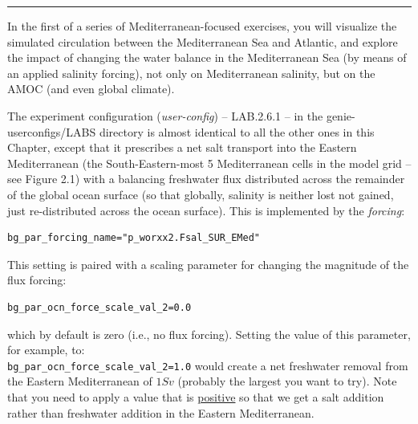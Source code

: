 \vspace{1mm}\noindent\rule{4cm}{0.5pt}\vspace{2mm}

\noindent  In the first of a series of Mediterranean-focused exercises, you will visualize the simulated circulation between the Mediterranean Sea and Atlantic, and explore the impact of changing the water balance in the Mediterranean Sea (by means of an applied salinity forcing), not only on Mediterranean salinity, but on the AMOC (and even global climate). 

\vspace{1mm}
The experiment configuration (\textit{user-config}) -- \textsf{\footnotesize LAB.2.6.1} -- in the \textsf{\footnotesize genie-userconfigs/LABS} directory is almost identical to all the other ones in this Chapter, except that it prescribes a net salt transport into the Eastern Mediterranean (the South-Eastern-most 5 Mediterranean cells in the model grid -- see Figure 2.1) with a balancing freshwater flux distributed across the remainder of the global ocean surface (so that globally, salinity is neither lost not gained, just re-distributed across the ocean surface). This is implemented by the \textit{forcing}:

\vspace{-2mm}\small\begin{verbatim}
bg_par_forcing_name="p_worxx2.Fsal_SUR_EMed"
\end{verbatim}\normalsize\vspace{-2mm}

\noindent This setting is paired with a scaling parameter for changing the magnitude of the flux forcing:

\vspace{-2mm}\small\begin{verbatim}
bg_par_ocn_force_scale_val_2=0.0
\end{verbatim}\normalsize\vspace{-2mm}

\noindent which by default is zero (i.e., no flux forcing). Setting the value of this parameter, for example, to: \\\texttt{\small bg\_par\_ocn\_force\_scale\_val\_2=1.0} would create a net freshwater removal from the Eastern Mediterranean of $1Sv$ (probably the largest you want to try). Note that you need to apply a value that is \uline{positive} so that we get a salt addition rather than freshwater addition in the Eastern Mediterranean.

